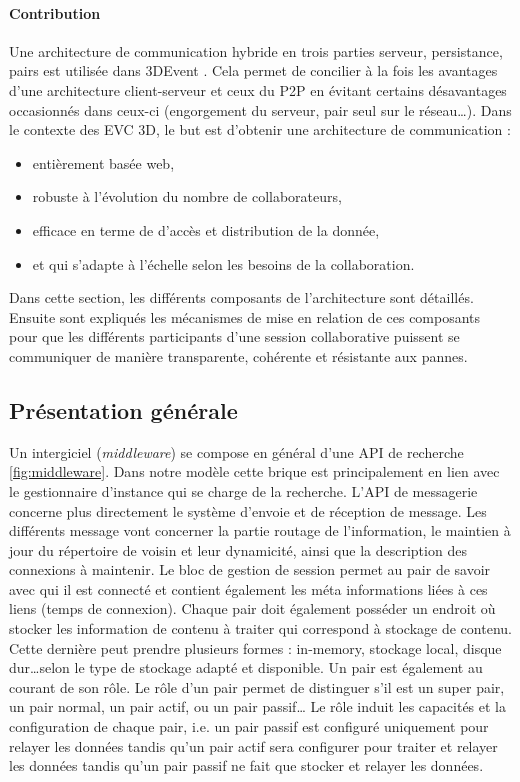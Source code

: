 

\paragraph{Contribution}
Une architecture de communication hybride en trois parties serveur, persistance, 
pairs est utilisée dans 3DEvent \cite{Desprat2016}. Cela permet de concilier à la 
fois les avantages d'une architecture client-serveur et ceux du \gls{P2P} en évitant 
certains désavantages occasionnés dans ceux-ci (engorgement du serveur, pair 
seul sur le réseau\dots). Dans le contexte des \gls{EVC} \gls{3D}, le but 
est d'obtenir une architecture de communication : 

\begin{itemize}
	\item entièrement basée web, 
	\item robuste à l'évolution du nombre de collaborateurs, 
	\item efficace en terme de d'accès et distribution de la donnée, 
	\item et qui s'adapte à l'échelle selon les besoins de la collaboration.
\end{itemize}

Dans cette section, les différents composants de l'architecture sont détaillés. 
Ensuite sont expliqués les mécanismes de mise en relation de 
ces composants pour que les différents participants d'une session 
collaborative puissent se communiquer de manière transparente, cohérente et 
résistante aux pannes.


\subsection{Présentation générale}
Un intergiciel (\textit{middleware}) se compose en général d'une API de 
recherche \ref{fig:middleware}.
Dans notre modèle cette brique est principalement en lien avec le 
gestionnaire d'instance qui se charge de la recherche. L'API de messagerie 
concerne plus directement le système d'envoie et de réception de message. Les 
différents message vont concerner la partie routage de l'information, le 
maintien à jour du répertoire de voisin et leur dynamicité, ainsi que la 
description des connexions à maintenir. Le bloc de gestion de session permet au 
pair de savoir avec qui il est connecté et contient également les méta informations 
liées à ces liens (temps de connexion). 
Chaque pair doit également posséder un endroit où stocker les information de 
contenu à traiter qui correspond à stockage de contenu. Cette dernière peut 
prendre plusieurs formes : in-memory, stockage local, disque dur\dots selon le 
type de stockage adapté et disponible.
Un pair est également au courant de son rôle. Le rôle d'un pair permet de 
distinguer s'il est un super pair, un pair normal, un pair actif, ou un pair passif\dots 
Le rôle induit les capacités et la configuration de chaque pair, i.e. un pair passif 
est configuré uniquement pour relayer les données tandis qu'un pair actif sera 
configurer pour traiter et relayer les données tandis qu'un pair passif ne fait que 
stocker et relayer les données.

